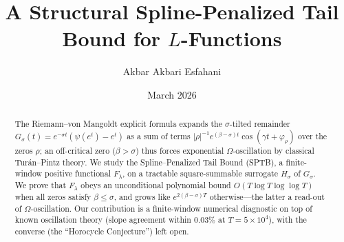 \documentclass[12pt]{amsart}
\title[A Structural Spline-Penalized Tail Bound]
{A Structural Spline-Penalized Tail Bound for $L$-Functions}
\author{Akbar Akbari Esfahani}
\date{March 2026}
\numberwithin{equation}{section}
\theoremstyle{definition}
\newcommand{\partbreak}{\clearpage}
\begin{document}
\begin{abstract}
The Riemann--von Mangoldt explicit formula expands the $\sigma$-tilted remainder
$G_\sigma(t)=e^{-\sigma t}(\psi(e^t)-e^t)$ as a sum of terms
$|\rho|^{-1}e^{(\beta-\sigma)t}\cos(\gamma t+\varphi_\rho)$ over the zeros $\rho$;
an off-critical zero ($\beta>\sigma$) thus forces exponential $\Omega$-oscillation
by classical Tur\'an--Pintz theory. We study the Spline--Penalized Tail Bound (SPTB),
a finite-window positive functional $F_\lambda$, on a tractable square-summable
surrogate $H_\sigma$ of $G_\sigma$. We prove that $F_\lambda$ obeys an
unconditional polynomial bound $O(T\log T\log\log T)$ when all zeros satisfy
$\beta\le\sigma$, and grows like $e^{2(\beta-\sigma)T}$ otherwise---the latter a
read-out of $\Omega$-oscillation. Our contribution is a finite-window numerical
diagnostic on top of known oscillation theory (slope agreement within $0.03\%$ at
$T=5\times10^4$), with the converse (the ``Horocycle Conjecture'') left open.
\end{abstract}

\maketitle
\clearpage

\tableofcontents
\clearpage


\partbreak


\partbreak


\partbreak


\partbreak


\clearpage

\appendix







\clearpage
\end{document}
